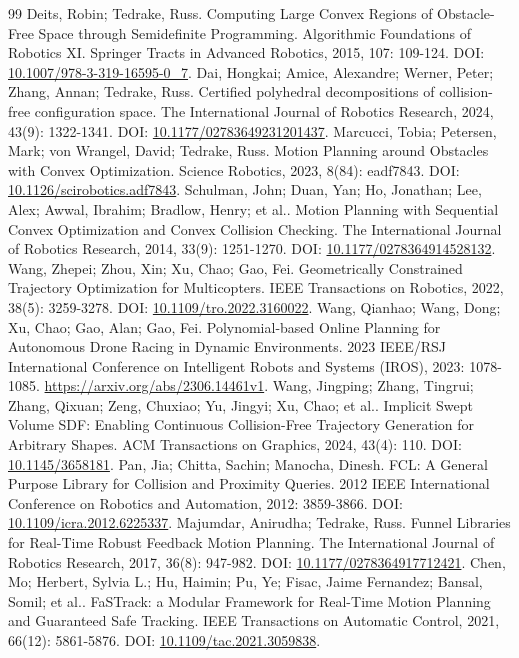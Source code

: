 \documentclass{aas}
\begin{document}
\begin{thebibliography}{99}
 Deits, Robin; Tedrake, Russ. Computing Large Convex Regions of Obstacle-Free Space through Semidefinite Programming. Algorithmic Foundations of Robotics XI. Springer Tracts in Advanced Robotics, 2015, 107: 109-124. DOI: \url{10.1007/978-3-319-16595-0_7}.
 Dai, Hongkai; Amice, Alexandre; Werner, Peter; Zhang, Annan; Tedrake, Russ. Certified polyhedral decompositions of collision-free configuration space. The International Journal of Robotics Research, 2024, 43(9): 1322-1341. DOI: \url{10.1177/02783649231201437}.
 Marcucci, Tobia; Petersen, Mark; von Wrangel, David; Tedrake, Russ. Motion Planning around Obstacles with Convex Optimization. Science Robotics, 2023, 8(84): eadf7843. DOI: \url{10.1126/scirobotics.adf7843}.
 Schulman, John; Duan, Yan; Ho, Jonathan; Lee, Alex; Awwal, Ibrahim; Bradlow, Henry; et al.. Motion Planning with Sequential Convex Optimization and Convex Collision Checking. The International Journal of Robotics Research, 2014, 33(9): 1251-1270. DOI: \url{10.1177/0278364914528132}.
 Wang, Zhepei; Zhou, Xin; Xu, Chao; Gao, Fei. Geometrically Constrained Trajectory Optimization for Multicopters. IEEE Transactions on Robotics, 2022, 38(5): 3259-3278. DOI: \url{10.1109/tro.2022.3160022}.
 Wang, Qianhao; Wang, Dong; Xu, Chao; Gao, Alan; Gao, Fei. Polynomial-based Online Planning for Autonomous Drone Racing in Dynamic Environments. 2023 IEEE/RSJ International Conference on Intelligent Robots and Systems (IROS), 2023: 1078-1085. \url{https://arxiv.org/abs/2306.14461v1}.
 Wang, Jingping; Zhang, Tingrui; Zhang, Qixuan; Zeng, Chuxiao; Yu, Jingyi; Xu, Chao; et al.. Implicit Swept Volume SDF: Enabling Continuous Collision-Free Trajectory Generation for Arbitrary Shapes. ACM Transactions on Graphics, 2024, 43(4): 110. DOI: \url{10.1145/3658181}.
 Pan, Jia; Chitta, Sachin; Manocha, Dinesh. FCL: A General Purpose Library for Collision and Proximity Queries. 2012 IEEE International Conference on Robotics and Automation, 2012: 3859-3866. DOI: \url{10.1109/icra.2012.6225337}.
 Majumdar, Anirudha; Tedrake, Russ. Funnel Libraries for Real-Time Robust Feedback Motion Planning. The International Journal of Robotics Research, 2017, 36(8): 947-982. DOI: \url{10.1177/0278364917712421}.
 Chen, Mo; Herbert, Sylvia L.; Hu, Haimin; Pu, Ye; Fisac, Jaime Fernandez; Bansal, Somil; et al.. FaSTrack: a Modular Framework for Real-Time Motion Planning and Guaranteed Safe Tracking. IEEE Transactions on Automatic Control, 2021, 66(12): 5861-5876. DOI: \url{10.1109/tac.2021.3059838}.

\end{thebibliography}
\end{document}
